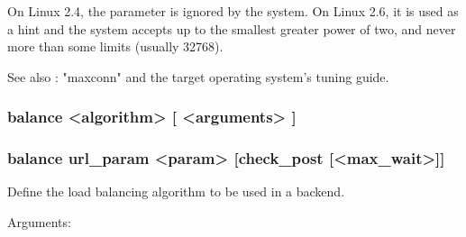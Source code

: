   On Linux 2.4, the parameter is ignored by the system. On Linux 2.6, it is
  used as a hint and the system accepts up to the smallest greater power of
  two, and never more than some limits (usually 32768).

  See also : "maxconn" and the target operating system's tuning guide.

\subsubsection[balance] {balance <algorithm> [ <arguments> ]}
\subsubsection*{balance url\_param <param> [check\_post [<max\_wait>]]}
  Define the load balancing algorithm to be used in a backend.

  
  Arguments:
